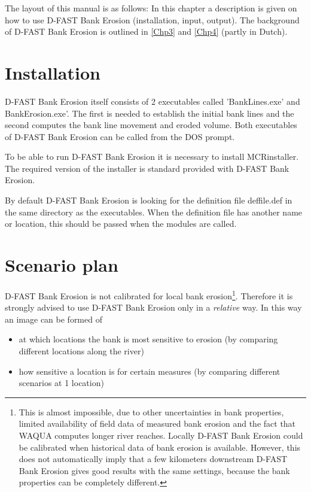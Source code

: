 The layout of this manual is as follows: In this chapter a description is given on how to use D-FAST Bank Erosion (installation, input, output).
The background of D-FAST Bank Erosion is outlined in \autoref{Chp3} and \autoref{Chp4} (partly in Dutch).

\section{Installation}

D-FAST Bank Erosion itself consists of 2 executables called 'BankLines.exe' and BankErosion.exe'.
The first is needed to establish the initial bank lines and the second computes the bank line movement and eroded volume.
Both executables of D-FAST Bank Erosion can be called from the DOS prompt.

To be able to run D-FAST Bank Erosion it is necessary to install MCRinstaller.
The required version of the installer is standard provided with D-FAST Bank Erosion.

By default D-FAST Bank Erosion is looking for the definition file deffile.def in the same directory as the executables.
When the definition file has another name or location, this should be passed when the modules are called.

\section{Scenario plan}

D-FAST Bank Erosion is not calibrated for local bank erosion\footnote{This is almost impossible, due to other uncertainties in bank properties, limited availability of field data of measured bank erosion and the fact that WAQUA computes longer river reaches.
Locally D-FAST Bank Erosion could be calibrated when historical data of bank erosion is available.
However, this does not automatically imply that a few kilometers downstream D-FAST Bank Erosion gives good results with the same settings, because the bank properties can be completely different.}.
Therefore it is strongly advised to use D-FAST Bank Erosion only in a \emph{relative} way.
In this way an image can be formed of

\begin{itemize}
\item at which locations the bank is most sensitive to erosion (by comparing different locations along the river)
\item how sensitive a location is for certain measures (by comparing different scenarios at 1 location)
\end{itemize}

